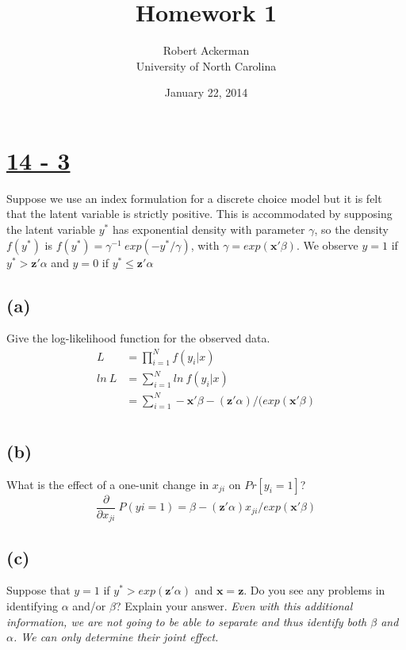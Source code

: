 \documentclass[11pt]{article}
\title{Homework 1}
\author{Robert Ackerman \\ University of North Carolina}
\date{January 22, 2014}							%
\theoremstyle{definition}
\begin{document}
\maketitle
\section*{\underline{14 - 3}} 
Suppose we use an index formulation for a discrete choice model but it is felt that the latent variable is strictly positive.  This is accommodated by supposing the latent variable $y^*$ has exponential density with parameter $\gamma$, so the density $f(y^*)$ is $f(y^*)=\gamma^{-1} \ exp (-y^*/\gamma)$, with $\gamma=exp(\boldsymbol{x}'\beta)$.  We observe $y=1$ if $y^*>\boldsymbol{z}'\alpha$ and $y=0$ if $y^*\leq\boldsymbol{z}'\alpha$
\subsection*{(a)}
Give the log-likelihood function for the observed data.
\begin{equation*}
\begin{split}
L &= \prod^N_{i=1} f(y_i|x) \\
ln \ L &= \sum^N_{i=1}  ln \ f(y_i|x) \\
 &=  \sum^N_{i=1}  -\boldsymbol{x}'\beta-(\boldsymbol{z}'\alpha)/(exp(\boldsymbol{x}'\beta) \\
\end{split}
\end{equation*}

\subsection*{(b)}
What is the effect of a one-unit change in $x_{ji}$ on $Pr[y_i = 1]$?
\begin{equation*}
\frac{\partial}{\partial x_{ji}} \ P(yi=1)= \beta-(\boldsymbol{z}'\alpha) x_{ji}/exp(\boldsymbol{x}'\beta)
\end{equation*}

\subsection*{(c)}
Suppose that $y=1$ if $y^* > exp(\boldsymbol{z}'\alpha)$ and $\boldsymbol{x}=\boldsymbol{z}$.  Do you see any problems in identifying $\alpha$ and/or $\beta$?  Explain your answer.
\textit{Even with this additional information, we are not going to be able to separate and thus identify both $\beta$ and $\alpha$.  We can only determine their joint effect.}
\end{document}
